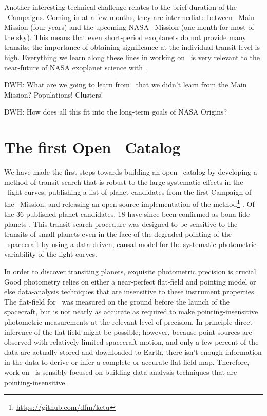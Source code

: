\documentclass[12pt,preprint]{aastex}
\begin{document}
Another interesting technical challenge relates to the brief duration
of the \kt\ Campaigns.
Coming in at a few months, they are intermediate between \kepler\ Main
Mission (four years) and the upcoming NASA \tess\ Mission (one month for most of the sky).
This means that even short-period exoplanets do not provide many
transits; the importance of obtaining significance at the
individual-transit level is high.
Everything we learn along these lines in working on \kt\ is very
relevant to the near-future of NASA exoplanet science with \tess.

DWH:  What are we going to learn from \ketu\ that we didn't learn from the Main Mission?  Populations!  Clusters!

DWH:  How does all this fit into the long-term goals of NASA Origins?

\section{The first Open \ketu\ Catalog}

We have made the first steps towards building an open \ketu\ catalog by
developing a method of transit search that is robust to the large systematic
effects in the \ketu\ light curves, publishing a list of planet candidates
from the first Campaign of the \ketu\ Mission, and releasing an open source
implementation of the method\footnote{\url{https://github.com/dfm/ketu}}
\citep{Foreman-Mackey:2015}.
Of the 36 published planet candidates, 18 have since been confirmed as bona
fide planets \citep{Armstrong:2015, Montet:2015}.
This transit search procedure was designed to be sensitive to the transits of
small planets even in the face of the degraded pointing of the \kepler\
spacecraft by using a data-driven, causal model for the systematic photometric
variability of the light curves.



In order to discover transiting planets, exquisite photometric precision is
crucial.
Good photometry relies on either a near-perfect flat-field
and pointing model or else data-analysis techniques that are
insensitive to these instrument properties.
The flat-field for \kepler\ was measured on the ground before the launch of
the spacecraft, but is not nearly as accurate as required to make
pointing-insensitive photometric measurements at the relevant level of
precision.
In principle direct inference of the flat-field might be possible;
however, because point sources are observed with relatively limited
spacecraft motion, and only a few percent of the data are actually stored and
downloaded to Earth, there isn't enough information in the data to derive or
infer a complete or accurate flat-field map.
Therefore, work on \KT\ is sensibly focused on building data-analysis
techniques that are pointing-insensitive.
\end{document}
